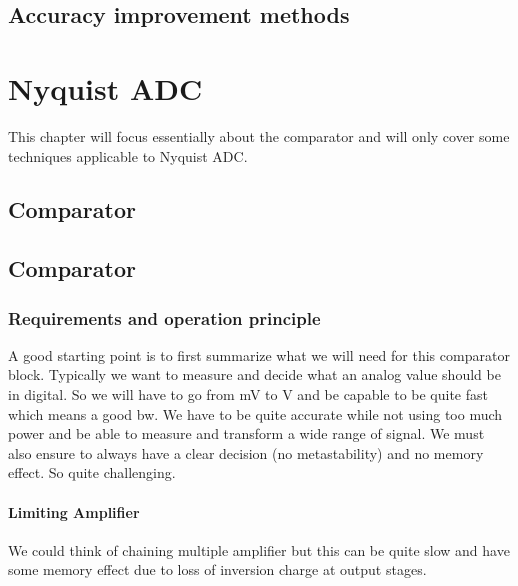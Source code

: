 \documentclass[
  a4paper,
]{article}
\begin{document}
\hypertarget{accuracy-improvement-methods}{%
\subsection{Accuracy improvement
methods}\label{accuracy-improvement-methods}}

\hypertarget{nyquist-adc}{%
\section{Nyquist ADC}\label{nyquist-adc}}

This chapter will focus essentially about the comparator and will only
cover some techniques applicable to Nyquist ADC.

\hypertarget{comparator}{%
\subsection{Comparator}\label{comparator}}

\hypertarget{comparator-1}{%
\subsection{Comparator}\label{comparator-1}}

\hypertarget{requirements-and-operation-principle}{%
\subsubsection{Requirements and operation
principle}\label{requirements-and-operation-principle}}

A good starting point is to first summarize what we will need for this
comparator block. Typically we want to measure and decide what an analog
value should be in digital. So we will have to go from mV to V and be
capable to be quite fast which means a good {bw}. We have to be quite
accurate while not using too much power and be able to measure and
transform a wide range of signal. We must also ensure to always have a
clear decision (no metastability) and no memory effect. So quite
challenging.

\hypertarget{limiting-amplifier}{%
\paragraph{Limiting Amplifier}\label{limiting-amplifier}}

We could think of chaining multiple amplifier but this can be quite slow
and have some memory effect due to loss of inversion charge at output
stages.
\end{document}
